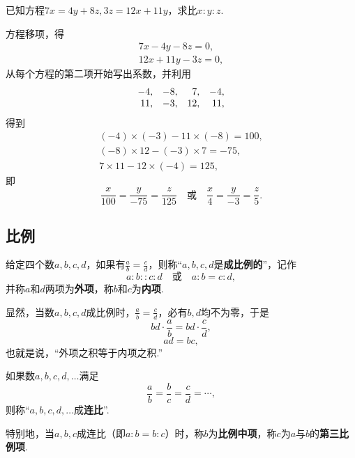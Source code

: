 \begin{example}
已知方程\(7x=4y+8z, 3z=12x+11y\)，求比\(x:y:z\).
\begin{solution}
方程移项，得\begin{gather*}
7x-4y-8z=0, \\
12x+11y-3z=0,
\end{gather*}
从每个方程的第二项开始写出系数，并利用\[
\begin{array}{*4r}
-4, & -8, & 7, & -4, \\
11, & -3, & 12, & 11,
\end{array}
\]得到\begin{gather*}
(-4)\times(-3)-11\times(-8)=100, \\
(-8)\times12-(-3)\times7=-75, \\
7\times11-12\times(-4)=125,
\end{gather*}即\[
\frac{x}{100}=\frac{y}{-75}=\frac{z}{125}
\quad\text{或}\quad
\frac{x}{4}=\frac{y}{-3}=\frac{z}{5}.
\]
\end{solution}
\end{example}

\subsection{比例}
\begin{definition}
给定四个数\(a,b,c,d\)，如果有\(\frac{a}{b}=\frac{c}{d}\)，则称“\(a,b,c,d\)是\textbf{成比例的}”，记作\[
a:b :: c:d
\quad\text{或}\quad
a:b = c:d,
\]并称\(a\)和\(d\)两项为\textbf{外项}，称\(b\)和\(c\)为\textbf{内项}.
\end{definition}

显然，当数\(a,b,c,d\)成比例时，\(\frac{a}{b}=\frac{c}{d}\)，必有\(b,d\)均不为零，于是\[
bd \cdot \frac{a}{b} = bd \cdot \frac{c}{d},
\]\[
ad = bc,
\]也就是说，“外项之积等于内项之积.”

\begin{definition}
如果数\(a,b,c,d,\dotsc\)满足\[
\frac{a}{b} = \frac{b}{c} = \frac{c}{d} = \dotsb,
\]则称“\(a,b,c,d,\dotsc\)成\textbf{连比}”.

特别地，当\(a,b,c\)成连比（即\(a:b = b:c\)）时，称\(b\)为\textbf{比例中项}，称\(c\)为\(a\)与\(b\)的\textbf{第三比例项}.
\end{definition}

